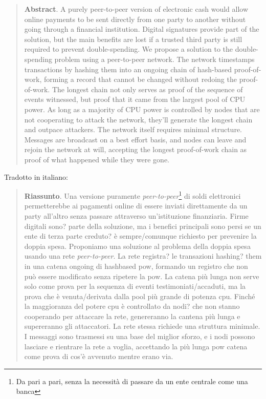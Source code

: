 \documentclass {article}
\begin{document}
\begin{quote}

\textbf {Abstract}. A purely peer-to-peer version of electronic cash would allow online payments to be sent directly from one party to another without going through a financial institution.
Digital signatures provide part of the solution, but the main benefits are lost if a trusted third party is still required to prevent double-spending.
We propose a solution to the double-spending problem using a peer-to-peer network.
The network timestamps transactions by hashing them into an ongoing chain of hash-based proof-of-work, forming a record that cannot be changed without redoing the proof-of-work.
The longest chain not only serves as proof of the sequence of events witnessed, but proof that it came from the largest pool of CPU power.
As long as a majority of CPU power is controlled by nodes that are not cooperating to attack the network, they'll generate the longest chain and outpace attackers.
The network itself requires minimal structure.
Messages are broadcast on a best effort basis, and nodes can leave and rejoin the network at will, accepting the longest proof-of-work chain as proof of what happened while they were gone.

\end{quote}
%
Tradotto in italiano:

\begin{quote}

\textbf {Riassunto}. Una versione puramente \textit{peer-to-peer}\footnote{Da pari a pari, senza la necessità di passare da un ente centrale come una banca} di soldi elettronici permetterebbe ai pagamenti online di essere inviati direttamente da un party all'altro senza passare attraverso un'istituzione finanziaria.
Firme digitali sono? parte della soluzione, ma i benefici principali sono persi se un ente di terza parte creduto? è sempre/comunque richiesto per prevenire la doppia spesa.
Proponiamo una soluzione al problema della doppia spesa usando una rete \textit{peer-to-peer}.
La rete registra? le transazioni hashing? them in una catena ongoing di hashbased pow, formando un registro che non può essere modificato senza ripetere la pow.
La catena più lunga non serve solo come prova per la sequenza di eventi testimoniati/accaduti, ma la prova che è venuta/derivata dalla pool più grande di potenza cpu. Finché la maggioranza del potere cpu è controllato da nodi? che non stanno cooperando per attaccare la rete, genereranno la cantena più lunga e supereranno gli attaccatori.
La rete stessa richiede una struttura minimale.
I messaggi sono trasmessi su una base del miglior sforzo, e i nodi possono lasciare e rientrare la rete a voglia, accettando la più lunga pow catena come prova di cos'è avvenuto mentre erano via.

\end {quote}
\end{document}

